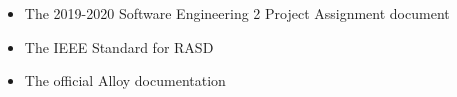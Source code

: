 \begin{itemize}
	\item The 2019-2020 Software Engineering 2 Project Assignment document
	\item The IEEE Standard for RASD 
	\item The official Alloy documentation
\end{itemize}